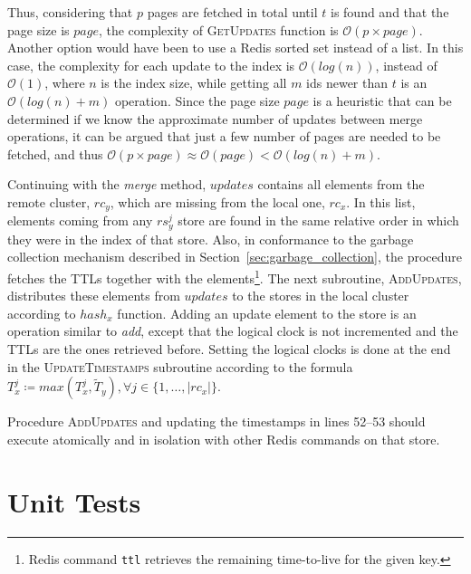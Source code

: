 Thus, considering that $p$ pages are fetched in total until $t$ is found and
that the page size is $page$, the complexity of {\small\textsc{GetUpdates}}
function is $\mathcal{O}(p \times page)$. Another option would have been to use
a Redis sorted set instead of a list. In this case, the complexity for each
update to the index is $\mathcal{O}(log(n))$, instead of $\mathcal{O}(1)$, where
$n$ is the index size, while getting all $m$ ids newer than $t$ is an
$\mathcal{O}(log(n)+m)$ operation. Since the page size $page$ is a heuristic
that can be determined if we know the approximate number of updates between
merge operations, it can be argued that just a few number of pages are needed to
be fetched, and thus $\mathcal{O}(p \times page) \approx \mathcal{O}(page) <
\mathcal{O}(log(n)+m)$.

Continuing with the \textit{merge} method, $updates$ contains all elements from
the remote cluster, $rc_{y}$, which are missing from the local one, $rc_{x}$.
In this list, elements coming from any $rs_{y}^{j}$ store are found in the same
relative order in which they were in the index of that store. Also, in
conformance to the garbage collection mechanism described in
Section~\ref{sec:garbage_collection}, the procedure fetches the TTLs together
with the elements\footnote{Redis command \texttt{ttl} retrieves the remaining
time-to-live for the given key.}. The next subroutine,
{\small\textsc{AddUpdates}}, distributes these elements from $updates$ to the
stores in the local cluster according to $hash_{x}$ function. Adding an update
element to the store is an operation similar to \textit{add}, except that the
logical clock is not incremented and the TTLs are the ones retrieved before.
Setting the logical clocks is done at the end in the
{\small\textsc{UpdateTimestamps}} subroutine according to the formula $T_{x}^{j}
\coloneqq max(T_{x}^{j}, \tilde{T}_{y}), \forall j \in \{1,\ldots,|rc_{x}|\}$.

Procedure {\small\textsc{AddUpdates}} and updating the timestamps in lines
52--53 should execute atomically and in isolation with other Redis commands on
that store.

\section{Unit Tests}
\label{sec:unit_tests}

